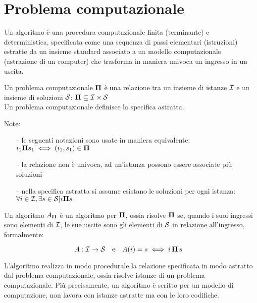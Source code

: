 \section{Problema computazionale}

\begin{definition}[Algoritmo]\label{def:alg}
    Un algoritmo è una procedura computazionale finita (terminante) e deterministica, specificata come una sequenza di passi elementari (istruzioni) estratte da un insieme standard associato a un modello computazionale (astrazione di un computer) che trasforma in maniera univoca un ingresso in un uscita.
\end{definition}


\begin{definition}\label{def:probcomp}
    Un problema computazionale $\bm{\Pi}{}$ è una relazione tra un insieme di istanze $\mathcal{I}{}$ e un insieme di soluzioni $\mathcal{S}{}$: $\bm{\Pi}{} \subseteq \mathcal{I}{} \times \mathcal{S}{}$
    \\
    Un problema computazionale definisce la specifica astratta. %
\end{definition}

Note:
\begin{itemize}[noitemsep,parsep=0pt,partopsep=0pt]
    \item[--] le seguenti notazioni sono usate in maniera equivalente: $i_1 \bm{\Pi}{} s_1 \iff (i_1 , s_1 ) \in \bm{\Pi}{}$
    \item[--] la relazione non è univoca, ad un'istanza possono essere associate più soluzioni
    \item[--] nella specifica astratta si assume esistano le soluzioni per ogni istanza: $\forall i \in \mathcal{I}{},\exists s \in \mathcal{S}{} | i \bm{\Pi}{} s$
\end{itemize}

Un algoritmo $A_{\bm{\Pi}{}}$ è un algoritmo per $\bm{\Pi}{}$, ossia risolve $\bm{\Pi}{}$ se, quando i suoi ingressi sono elementi di $\mathcal{I}{}$, le sue uscite sono gli elementi di $\mathcal{S}{}$ in relazione all'ingresso, formalmente:

$$ A: \mathcal{I}{} \to \mathcal{S}{} \quad \textrm{e} \quad A(i)=s \iff i \, \bm{\Pi}{} \, s $$

L'algoritmo realizza in modo procedurale la relazione specificata in modo astratto dal problema computazionale, ossia risolve istanze di un problema computazionale. Più precisamente, un algoritmo è scritto per un modello di computazione, non lavora con istanze astratte ma con le loro codifiche.

